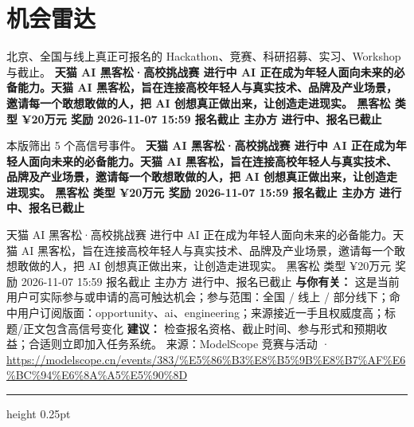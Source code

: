 \documentclass[10.5pt]{ctexart}
\begin{document}
\section*{机会雷达}
{\color{ormuted} 北京、全国与线上真正可报名的 Hackathon、竞赛、科研招募、实习、Workshop 与截止。}
\vspace{2mm}
{\LARGE\bfseries 天猫 AI 黑客松·高校挑战赛 进行中 AI 正在成为年轻人面向未来的必备能力。天猫 AI 黑客松，旨在连接高校年轻人与真实技术、品牌及产业场景，邀请每一个敢想敢做的人，把 AI 创想真正做出来，让创造走进现实。 黑客松 类型 ¥20万元 奖励 2026-11-07 15:59 报名截止 主办方 进行中、报名已截止}\par
\vspace{1mm}
{\color{ormuted} 本版筛出 5 个高信号事件。}
\vspace{3mm}
{\Large\bfseries 天猫 AI 黑客松·高校挑战赛 进行中 AI 正在成为年轻人面向未来的必备能力。天猫 AI 黑客松，旨在连接高校年轻人与真实技术、品牌及产业场景，邀请每一个敢想敢做的人，把 AI 创想真正做出来，让创造走进现实。 黑客松 类型 ¥20万元 奖励 2026-11-07 15:59 报名截止 主办方 进行中、报名已截止}\par
天猫 AI 黑客松·高校挑战赛 进行中 AI 正在成为年轻人面向未来的必备能力。天猫 AI 黑客松，旨在连接高校年轻人与真实技术、品牌及产业场景，邀请每一个敢想敢做的人，把 AI 创想真正做出来，让创造走进现实。 黑客松 类型 ¥20万元 奖励 2026-11-07 15:59 报名截止 主办方 进行中、报名已截止
\textbf{与你有关：} 这是当前用户可实际参与或申请的高可触达机会；参与范围：全国 / 线上 / 部分线下；命中用户订阅版面：opportunity、ai、engineering；来源接近一手且权威度高；标题/正文包含高信号变化
\textbf{建议：} 检查报名资格、截止时间、参与形式和预期收益；合适则立即加入任务系统。
{\footnotesize\color{ormuted} 来源：ModelScope 竞赛与活动 · \url{https://modelscope.cn/events/383/%E5%86%B3%E8%B5%9B%E8%B7%AF%E6%BC%94%E6%8A%A5%E5%90%8D}}
\vspace{4mm}
\hrule height 0.25pt
\vspace{3mm}
\end{document}
